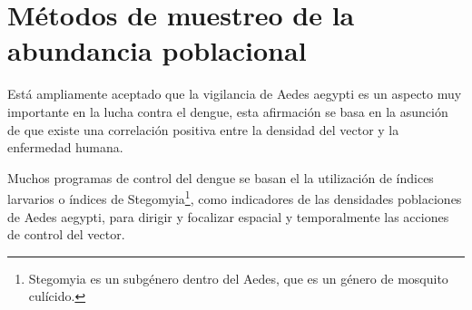 \section{Métodos de muestreo de la abundancia poblacional}
\label{sec:densidad-vectorial-introduccion}

Está ampliamente aceptado que la vigilancia de Aedes aegypti es un aspecto muy importante en la
lucha contra el dengue, esta afirmación se basa en la asunción de que existe una correlación
positiva entre la densidad del vector y la enfermedad humana\cite{world2009dengue, dengueUruguayCap2}.

Muchos programas de control del dengue se basan el la utilización de índices larvarios o índices
de Stegomyia\footnote{Stegomyia es un subgénero dentro del Aedes, que es un género de mosquito culícido.}, como indicadores de las densidades poblaciones de Aedes aegypti, para dirigir y
focalizar espacial y temporalmente las acciones de control del vector.



%
%
%
